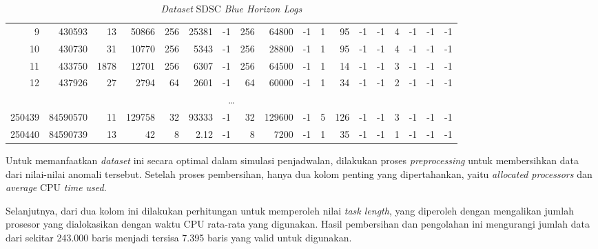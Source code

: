 \begin{table} [H]
    \centering
    \small
    \caption{\textit{Dataset} SDSC \textit{Blue Horizon Logs}}
    \label{tabel:SDSC}
    \renewcommand{\arraystretch}{1.1}
    \begin{adjustbox}{max width=\textwidth}
    \begin{tabular}{rrrrrrrrrrrrrrrrrr}
    \hline
    9 & 430593 & 13 & 50866 & 256 & 25381 & -1 & 256 & 64800 & -1 & 1 & 95 & -1 & -1 & 4 & -1 & -1 & -1 \\
    10 & 430730 & 31 & 10770 & 256 & 5343 & -1 & 256 & 28800 & -1 & 1 & 95 & -1 & -1 & 4 & -1 & -1 & -1 \\
    11 & 433750 & 1878 & 12701 & 256 & 6307 & -1 & 256 & 64500 & -1 & 1 & 14 & -1 & -1 & 3 & -1 & -1 & -1 \\
    12 & 437926 & 27 & 2794 & 64 & 2601 & -1 & 64 & 60000 & -1 & 1 & 34 & -1 & -1 & 2 & -1 & -1 & -1 \\
    \multicolumn{18}{c}{\dots} \\
    250439 & 84590570 & 11 & 129758 & 32 & 93333 & -1 & 32 & 129600 & -1 & 5 & 126 & -1 & -1 & 3 & -1 & -1 & -1 \\
    250440 & 84590739 & 13 & 42 & 8 & 2.12 & -1 & 8 & 7200 & -1 & 1 & 35 & -1 & -1 & 1 & -1 & -1 & -1 \\
    \hline
    \end{tabular}
    \end{adjustbox}
\end{table}

Untuk memanfaatkan \textit{dataset} ini secara optimal dalam simulasi penjadwalan, dilakukan proses \textit{preprocessing} untuk membersihkan data dari nilai-nilai anomali tersebut. Setelah proses pembersihan, hanya dua kolom penting yang dipertahankan, yaitu \textit{allocated processors} dan \textit{average} CPU \textit{time used}.

Selanjutnya, dari dua kolom ini dilakukan perhitungan untuk memperoleh nilai \textit{task length}, yang diperoleh dengan mengalikan jumlah prosesor yang dialokasikan dengan waktu CPU rata-rata yang digunakan. Hasil pembersihan dan pengolahan ini mengurangi jumlah data dari sekitar 243.000 baris menjadi tersisa 7.395 baris yang valid untuk digunakan.

